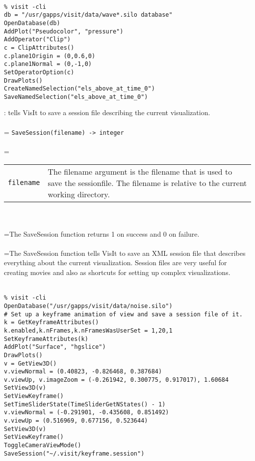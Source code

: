 \documentclass[10pt,a4paper]{report}
\begin{document}
\\[-6mm]
\begin{verbatim}% visit -cli
db = "/usr/gapps/visit/data/wave*.silo database"
OpenDatabase(db)
AddPlot("Pseudocolor", "pressure")
AddOperator("Clip")
c = ClipAttributes()
c.plane1Origin = (0,0.6,0)
c.plane1Normal = (0,-1,0)
SetOperatorOption(c)
DrawPlots()
CreateNamedSelection("els_above_at_time_0")
SaveNamedSelection("els_above_at_time_0")
\end{verbatim}
\newpage


{}
: tells VisIt to save a session file describing the current visualization.\\[-3mm]

 \\ 
\hangindent=\parindent 
\verb!SaveSession(filename) -> integer!\\ [-3mm]

 \\ 
\hangindent=\parindent 
\begin{tabular}{lp{9cm}}
\verb!filename! & The filename argument is the filename that is used to save the sessionfile. The filename is relative to the current working directory. \\
\end{tabular} \\[-2mm]


 \\ 
\hangindent=\parindent The SaveSession function returns 1 on success and 0 on failure. \\[-3mm] 

 \\ 
\hangindent=\parindent The SaveSession function tells VisIt to save an XML session file that describes everything about the current visualization. Session files are very useful for creating movies and also as shortcuts for setting up complex visualizations. \\[-3mm] 

\\[-6mm]
\begin{verbatim}% visit -cli
OpenDatabase("/usr/gapps/visit/data/noise.silo")
# Set up a keyframe animation of view and save a session file of it.
k = GetKeyframeAttributes()
k.enabled,k.nFrames,k.nFramesWasUserSet = 1,20,1
SetKeyframeAttributes(k)
AddPlot("Surface", "hgslice")
DrawPlots()
v = GetView3D()
v.viewNormal = (0.40823, -0.826468, 0.387684)
v.viewUp, v.imageZoom = (-0.261942, 0.300775, 0.917017), 1.60684
SetView3D(v)
SetViewKeyframe()
SetTimeSliderState(TimeSliderGetNStates() - 1)
v.viewNormal = (-0.291901, -0.435608, 0.851492)
v.viewUp = (0.516969, 0.677156, 0.523644)
SetView3D(v)
SetViewKeyframe()
ToggleCameraViewMode()
SaveSession("~/.visit/keyframe.session")
\end{verbatim}
\newpage
\end{document}
